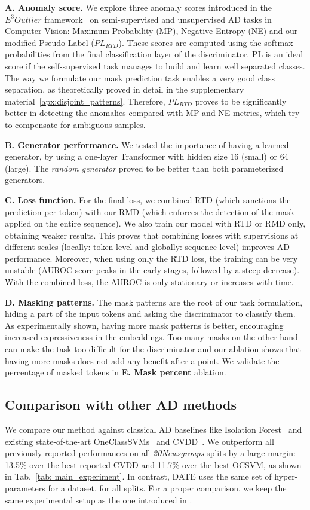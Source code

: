\documentclass[11pt]{article}
\begin{document}
\noindent\textbf{A. Anomaly score.} We explore three anomaly scores introduced in the \emph{$E^{3}Outlier$} framework~\cite{neurips2019} on semi-supervised and unsupervised AD tasks in Computer Vision: Maximum Probability (MP), Negative Entropy (NE) and our modified Pseudo Label ($PL_{RTD}$). These scores are computed using the softmax probabilities from the final classification layer of the discriminator. PL is an ideal score if the self-supervised task manages to build and learn well separated classes. The way we formulate our mask prediction task enables a very good class separation, as theoretically proved in detail in the supplementary material~\ref{apx:disjoint_patterns}. Therefore, $PL_{RTD}$ proves to be significantly better in detecting the anomalies compared with MP and NE metrics, which try to compensate for ambiguous samples.


\noindent\textbf{B. Generator performance.} We tested the importance of having a learned generator, by using a one-layer Transformer with hidden size 16 (small) or 64 (large). The \emph{random generator} proved to be better than both parameterized generators.

\noindent\textbf{C. Loss function.} For the final loss, we combined RTD (which sanctions the prediction per token) with our RMD (which enforces the detection of the mask applied on the entire sequence). We also train our model with RTD or RMD only, obtaining weaker results. This proves that combining losses with supervisions at different scales (locally: token-level and globally: sequence-level) improves AD performance. Moreover, when using only the RTD loss, the training can be very unstable (AUROC score peaks in the early stages, followed by a steep decrease). With the combined loss, the AUROC is only stationary or increases with time.


\noindent\textbf{D. Masking patterns.} The mask patterns are the root of our task formulation, hiding a part of the input tokens and asking the discriminator to classify them. As experimentally shown, having more mask patterns is better, encouraging increased expressiveness in the embeddings. Too many masks on the other hand can make the task too difficult for the discriminator and our ablation shows that having more masks does not add any benefit after a point. We validate the percentage of masked tokens in \textbf{E. Mask percent} ablation.

\subsection{Comparison with other AD methods}
\label{sec: ex-ssad}
We compare our method against classical AD baselines like Isolation Forest~\cite{iso_forest} and existing state-of-the-art OneClassSVMs~\cite{ocsmv} and CVDD~\cite{acl2019}. We outperform all previously reported performances on all \emph{20Newsgroups} splits by a large margin: 13.5\% over the best reported CVDD and 11.7\% over the best OCSVM, as shown in Tab.~\ref{tab: main_experiment}. In contrast, DATE uses the same set of hyper-parameters for a dataset, for all splits. For a proper comparison, we keep the same experimental setup as the one introduced in \cite{acl2019}.
\end{document}
